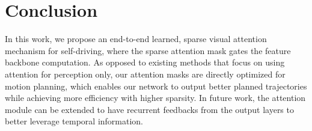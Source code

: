 \vspace{-0.1in}
\section{Conclusion}
In this work, we propose an end-to-end learned, sparse visual attention
mechanism for self-driving, where the sparse attention mask gates the feature backbone
computation. As opposed to existing methods that focus on using attention for perception only,
our attention masks are directly optimized for motion planning, which enables our network to output
better planned trajectories while achieving more efficiency with higher sparsity. In future work,
the attention module can be extended to have recurrent feedbacks from the output layers
to better leverage temporal information.

